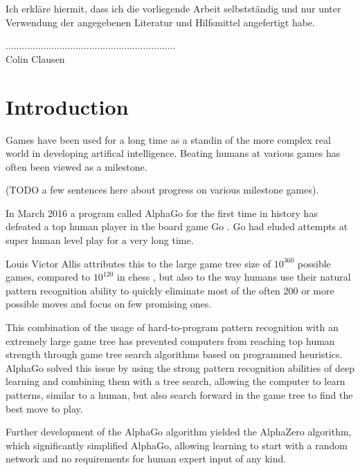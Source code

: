 \documentclass[12pt,onecolumn,oneside,titlepage]{article}
\begin{document}
\noindent Ich erkläre hiermit, dass ich die vorliegende Arbeit selbstständig und nur unter Verwendung der angegebenen Literatur und Hilfsmittel angefertigt habe.

\vspace{2cm}
\noindent ............................................................... \\
Colin Clausen

\thispagestyle{empty}

\pagebreak

\newpage\null\thispagestyle{empty}\newpage


\tableofcontents

\pagebreak



\section{Introduction}

Games have been used for a long time as a standin of the more complex real world in developing artifical intelligence. Beating humans at various games has often been viewed as a milestone.

(TODO a few sentences here about progress on various milestone games).

In March 2016 a program called AlphaGo for the first time in history has defeated a top human player in the board game Go \cite{leesedolVsAlphaGo}.
Go had eluded attempts at super human level play for a very long time.

Louis Victor Allis attributes \cite{allis1994searching} this to the large game tree size of $10^{360}$ possible games, compared to $10^{120}$ in chess \cite{shannon1950xxii},
but also to the way humans use their natural pattern recognition ability to quickly eliminate most of the often 200 or more possible moves and focus on few promising ones.

This combination of the usage of hard-to-program pattern recognition with an extremely large game tree has prevented computers from reaching top human strength through game tree search algorithms based on programmed heuristics.
AlphaGo solved this issue by using the strong pattern recognition abilities of deep learning and combining them with a tree search, allowing the computer to learn patterns, similar to a human, but also search forward in the game tree to find the best move to play.

Further development of the AlphaGo algorithm yielded the AlphaZero algorithm, which significantly simplified AlphaGo, allowing learning to start with a random network and no requirements for human expert input of any kind.
\end{document}
